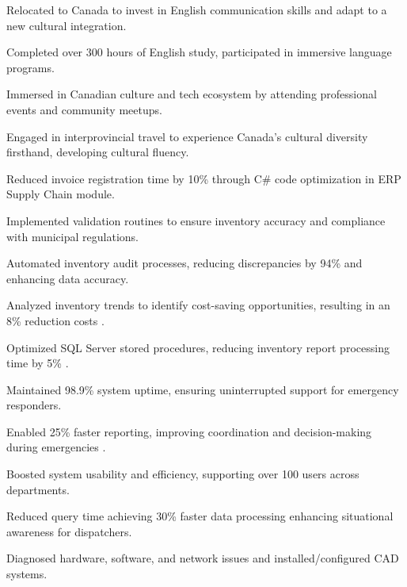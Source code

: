 \begin{zitemize}
\item Relocated to Canada to invest in English communication skills and adapt to a new cultural integration.
\item Completed over 300 hours of English study, participated in immersive language programs.
\item Immersed in Canadian culture and tech ecosystem by attending professional events and community meetups.
\item Engaged in interprovincial travel to experience Canada’s cultural diversity firsthand, developing cultural fluency.
\end{zitemize}

\begin{zitemize}
\item Reduced invoice registration time by 10\% through C\# code optimization in ERP Supply Chain module.
\item Implemented validation routines to ensure inventory accuracy and compliance with municipal regulations.
\item Automated inventory audit processes, reducing discrepancies by 94\% and enhancing data accuracy.
\item Analyzed inventory trends to identify cost-saving opportunities, resulting in an 8\% reduction costs .
\item Optimized SQL Server stored procedures, reducing inventory report processing time by 5\% .
\end{zitemize}

\begin{zitemize}
\item Maintained 98.9\% system uptime, ensuring uninterrupted support for emergency responders.
\item Enabled 25\% faster reporting, improving coordination and decision-making during emergencies .
\item Boosted system usability and efficiency, supporting over 100 users across departments.
\item Reduced query time achieving 30\% faster data processing enhancing situational awareness for dispatchers.
\item Diagnosed hardware, software, and network issues and installed/configured CAD systems.
\end{zitemize}

